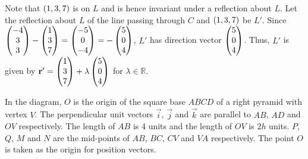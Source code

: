 \documentclass{echw}
\begin{document}

            Note that $\left(1, 3, 7\right)$ is on $L$ and is hence invariant under a reflection about $L$. Let the reflection about $L$ of the line passing through $C$ and $\left(1, 3, 7\right)$ be $L'$. Since $\begin{pmatrix} -4 \\ 3 \\ 3 \end{pmatrix} - \begin{pmatrix} 1 \\ 3 \\ 7 \end{pmatrix} = \begin{pmatrix} -5 \\ 0 \\ -4 \end{pmatrix} = -\begin{pmatrix} 5 \\ 0 \\ 4 \end{pmatrix}$, $L'$ has direction vector $\begin{pmatrix} 5 \\ 0 \\ 4 \end{pmatrix}$. Thus, $L'$ is given by $\mathbf{r}' = \begin{pmatrix} 1 \\ 3 \\ 7 \end{pmatrix} + \lambda \begin{pmatrix} 5 \\ 0 \\ 4 \end{pmatrix}$ for $\lambda \in \mathbb{R}$.


    \problem{}
        \begin{center}
        \end{center}
        In the diagram, $O$ is the origin of the square base $ABCD$ of a right pyramid with vertex $V$. The perpendicular unit vectors $\vec i$, $\vec j$ and $\vec k$ are parallel to $AB$, $AD$ and $OV$ respectively. The length of $AB$ is 4 units and the length of $OV$ is $2h$ units. $P$, $Q$, $M$ and $N$ are the mid-points of $AB$, $BC$, $CV$ and $VA$ respectively. The point $O$ is taken as the origin for position vectors.
\end{document}
